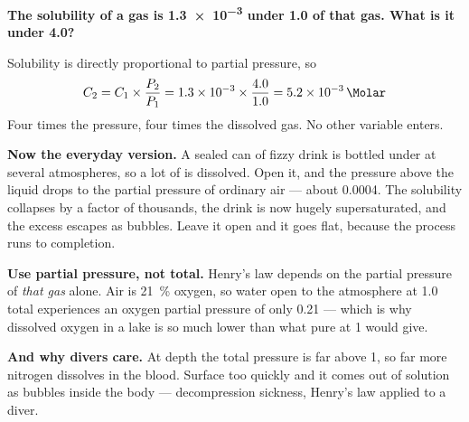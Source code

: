 \documentclass{apchem-worksheet}
\begin{document}
\begin{workedexample}
\textbf{The solubility of a gas is \SI{1.3e-3}{\Molar} under
\SI{1.0}{\atm} of that gas. What is it under
\SI{4.0}{\atm}?}

Solubility is directly proportional to partial pressure, so
\[ C_{2} = C_{1} \times \frac{P_{2}}{P_{1}}
        = \num{1.3e-3} \times \frac{4.0}{1.0}
        = \mathbf{\SI{5.2e-3}{\Molar}} \]
Four times the pressure, four times the dissolved gas. No other
variable enters.

\textbf{Now the everyday version.} A sealed can of fizzy drink is
bottled under  at several atmospheres, so a lot of  is
dissolved. Open it, and the pressure above the liquid drops to the
 partial pressure of ordinary air --- about
\SI{0.0004}{\atm}. The solubility collapses by a factor of
thousands, the drink is now hugely supersaturated, and the excess
 escapes as bubbles. Leave it open and it goes flat, because
the process runs to completion.

\textbf{Use partial pressure, not total.} Henry's law depends on the
partial pressure of \emph{that gas} alone. Air is \SI{21}{\percent}
oxygen, so water open to the atmosphere at \SI{1.0}{\atm} total
experiences an oxygen partial pressure of only
\SI{0.21}{\atm} --- which is why dissolved oxygen in a lake is
so much lower than what pure  at \SI{1}{\atm} would give.

\textbf{And why divers care.} At depth the total pressure is far above
\SI{1}{\atm}, so far more nitrogen dissolves in the blood.
Surface too quickly and it comes out of solution as bubbles inside the
body --- decompression sickness, Henry's law applied to a diver.
\end{workedexample}
\end{document}
